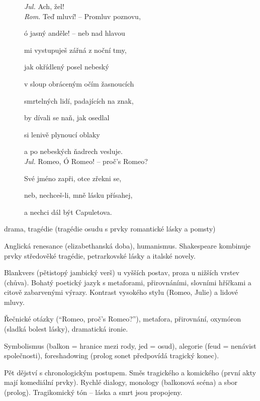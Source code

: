 \documentclass[FGBook.tex]{subfiles}
\begin{document}

\noindent\begin{figure}\footnotesize
{}
\setlength{\parindent}{3pt}
\noindent \textit{Jul.} Ach, žel! \\
\textit{Rom.} Teď mluví! -- Promluv poznovu, \par
ó jasný anděle! -- neb nad hlavou \par
mi vystupuješ zářná z noční tmy, \par
jak okřídlený posel nebeský \par
v sloup obráceným očím žasnoucích \par
smrtelných lidí, padajících na znak, \par
by dívali se naň, jak osedlal \par
si lenivě plynoucí oblaky \par
a po nebeských ňadrech vesluje. \\
\textit{Jul.} Romeo, Ó Romeo! -- proč's Romeo? \par
Své jméno zapři, otce zřekni se, \par
neb, nechceš-li, mně lásku přísahej, \par
a nechci dál být Capuletova.
\end{figure}


\noindent drama, tragédie (tragédie osudu s prvky romantické lásky a pomsty)

\noindent Anglická renesance (elizabethanská doba), humanismus. Shakespeare kombinuje prvky středověké tragédie, petrarkovské lásky a italské novely.

\noindent Blankvers (pětistopý jambický verš) u vyšších postav, proza u nižších vrstev (chůva). Bohatý poetický jazyk s metaforami, přirovnáními, slovními hříčkami a citově zabarvenými výrazy. Kontrast vysokého stylu (Romeo, Julie) a lidové mluvy.

\noindent Řečnické otázky (\enquote{Romeo, proč's Romeo?}), metafora, přirovnání, oxymóron (sladká bolest lásky), dramatická ironie.

\noindent Symbolismus (balkon = hranice mezi rody, jed = osud), alegorie (feud = nenávist společnosti), foreshadowing (prolog sonet předpovídá tragický konec).

\noindent Pět dějství s chronologickým postupem. Směs tragického a komického (první akty mají komediální prvky). Rychlé dialogy, monology (balkonová scéna) a sbor (prolog). Tragikomický tón – láska a smrt jsou propojeny.
\end{document}
